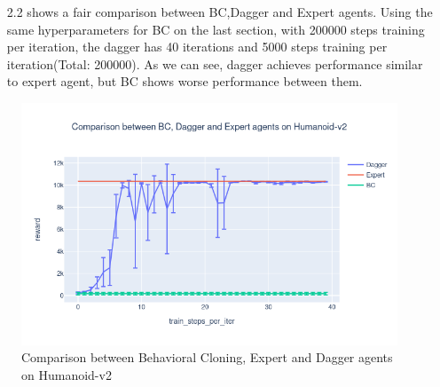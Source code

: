 \begin{itemize}
    \item [2.2]  shows a fair comparison between BC,Dagger and 
    Expert agents. Using the same hyperparameters for BC on the last section, with 200000 steps training per iteration,
    the dagger has 40 iterations and 5000 steps training per iteration(Total: 200000). As we can see, dagger achieves
    performance similar to expert agent, but BC shows worse performance between them. 
\end{itemize}

\begin{figure}
\begin{center}
    \includegraphics[scale=0.5]{./figs/comparison_bc_expert_dagger.png} 
\end{center}
\caption{Comparison between Behavioral Cloning, Expert and Dagger agents on Humanoid-v2}
\label{fig:dagger}
\end{figure}


    

